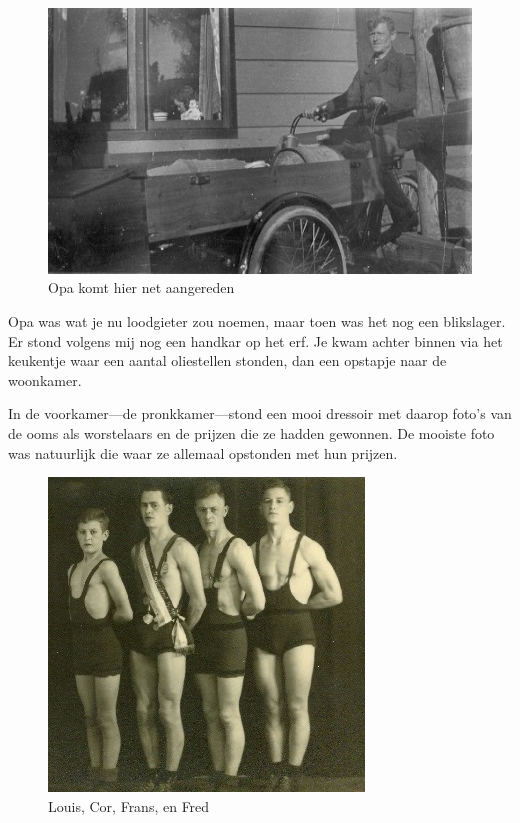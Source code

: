 \documentclass[12pt,twoside, openright]{memoir}
\begin{document}
\begin{figure}
\includegraphics[width=\textwidth]{img/ch3/opakriek2}
\caption*{\footnotesize Opa komt hier net aangereden}
\end{figure}

Opa was wat je nu loodgieter zou noemen, maar toen was het nog een blikslager. Er stond volgens mij nog een handkar op het erf. Je kwam achter binnen via het keukentje waar een aantal oliestellen stonden, dan een opstapje naar de woonkamer. 

In de voorkamer---de pronkkamer---stond een mooi dressoir met daarop foto’s van de ooms als worstelaars en de prijzen die ze hadden gewonnen. De mooiste foto was natuurlijk die waar ze allemaal opstonden met hun prijzen. 

\begin{figure}
\includegraphics[width=\textwidth]{img/ch3/Louiscorfransfred}
\caption*{\footnotesize Louis, Cor, Frans, en Fred}
\end{figure}
\end{document}
